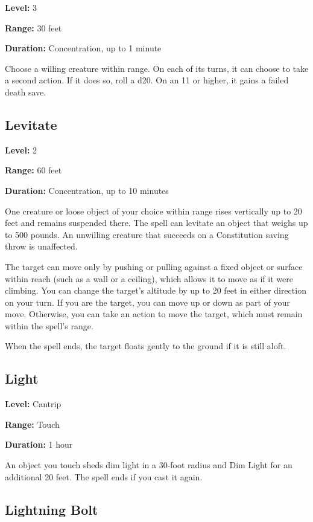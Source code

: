 \documentclass[12pt,letterpaper,twocolumn,openany,nodeprecatedcode,bg=none]{dndbook}
\let\oldsubsection\subsection
\renewcommand{\subsection}[1]{%
  \needspace{5\baselineskip}%
  \oldsubsection{#1}%
}
\begin{document}
\textbf{Level:} 3

\textbf{Range:} 30 feet

\textbf{Duration:} Concentration, up to 1 minute

Choose a willing creature within range. On each of its turns, it can
choose to take a second action. If it does so, roll a d20. On an 11 or
higher, it gains a failed death save.

\subsection{Levitate}\label{levitate}

\textbf{Level:} 2

\textbf{Range:} 60 feet

\textbf{Duration:} Concentration, up to 10 minutes

One creature or loose object of your choice within range rises
vertically up to 20 feet and remains suspended there. The spell can
levitate an object that weighs up to 500 pounds. An unwilling creature
that succeeds on a Constitution saving throw is unaffected.

The target can move only by pushing or pulling against a fixed object or
surface within reach (such as a wall or a ceiling), which allows it to
move as if it were climbing. You can change the target's altitude by up
to 20 feet in either direction on your turn. If you are the target, you
can move up or down as part of your move. Otherwise, you can take an
action to move the target, which must remain within the spell's range.

When the spell ends, the target floats gently to the ground if it is
still aloft.

\subsection{Light}\label{light}

\textbf{Level:} Cantrip

\textbf{Range:} Touch

\textbf{Duration:} 1 hour

An object you touch sheds dim light in a 30-foot radius and Dim Light
for an additional 20 feet. The spell ends if you cast it again.

\subsection{Lightning Bolt}\label{lightning-bolt}
\end{document}
